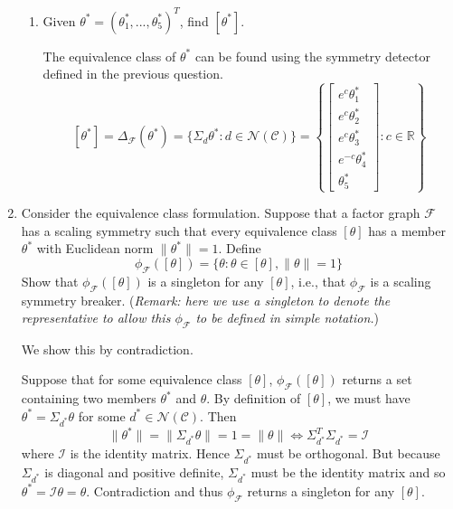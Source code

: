\begin{enumerate}
\begin{enumerate}
\item
Given $\theta^*=(\theta_1^*,...,\theta_5^*)^T$, find $[\theta^*]$.

\begin{solution}
The equivalence class of $\theta^*$ can be found using the symmetry detector defined in the previous question.
\[
[\theta^*] = \Delta_\mathcal{F}(\theta^*) = \{\Sigma_d\theta^*:d\in\mathcal{N}(\mathcal{C})\} = \left\{
\begin{bmatrix}
e^c\theta_1^* \\
e^c\theta_2^* \\
e^c\theta_3^* \\
e^{-c}\theta_4^* \\
\theta_5^*
\end{bmatrix}
:
c\in\mathbb{R}
\right\}
\]
\end{solution}

\iffalse
\item
Let $\|\cdot\|$ denote the Euclidean norm. Suppose that for any equivalence class $[\theta]$, no two members have the same norm. Consider a symmetry breaker of the form
\[
\phi_\mathcal{F}([\theta])=\{\theta:\theta\in[\theta],\|\theta\|=1\}
\]
\fi

\end{enumerate}

\iffalse
\item
Consider the equivalence class formulation. Suppose that a factor graph $\mathcal{F}$ has a scaling symmetry such that every equivalence class $[\theta]$ has a member $\theta^*$ with Euclidean norm $\|\theta^*\|=1$. Define
\[
\phi_\mathcal{F}([\theta])=\{\theta:\theta\in[\theta],\|\theta\|=1\}
\]
Show that $\phi_\mathcal{F}([\theta])$ is a singleton for any $[\theta]$, i.e., that $\phi_\mathcal{F}$ is a scaling symmetry breaker. (\textit{Remark: here we use a singleton to denote the representative to allow this $\phi_\mathcal{F}$ to be defined in simple notation.})

\begin{solution}
We show this by contradiction.

Suppose that for some equivalence class $[\theta]$, $\phi_\mathcal{F}([\theta])$ returns a set containing two members $\theta^*$ and $\theta$. By definition of $[\theta]$, we must have $\theta^*=\Sigma_{d^*}\theta$ for some $d^*\in\mathcal{N}(\mathcal{C})$. Then
\[
\|\theta^*\| = \|\Sigma_{d^*}\theta\| = 1 = \|\theta\| \iff \Sigma_{d^*}^T\Sigma_{d^*} = \mathcal{I}
\]
where $\mathcal{I}$ is the identity matrix. Hence $\Sigma_{d^*}$ must be orthogonal. But because $\Sigma_{d^*}$ is diagonal and positive definite, $\Sigma_{d^*}$ must be the identity matrix and so $\theta^*=\mathcal{I}\theta = \theta$. Contradiction and thus $\phi_\mathcal{F}$ returns a singleton for any $[\theta]$.


\end{solution}
\end{enumerate}
